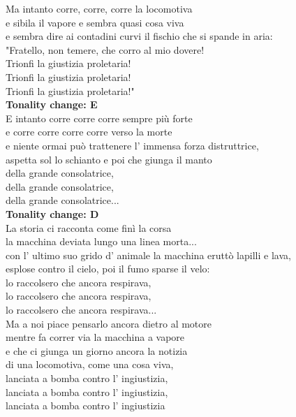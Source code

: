 \documentclass[10pt, twoside, a4paper]{article}
\begin{document}
Ma intanto corre, corre, corre la locomotiva    \\
e sibila il vapore e sembra quasi cosa viva     \\
e sembra dire ai contadini curvi il fischio che si spande in aria:\\
"Fratello, non temere, che corro al mio dovere!\\
Trionfi la giustizia proletaria!\\
Trionfi la giustizia proletaria!\\
Trionfi la giustizia proletaria!"\\

\textbf{Tonality change: E}\\
E intanto corre corre corre sempre più forte\\
e corre corre corre corre verso la morte\\
e niente ormai può trattenere l' immensa forza distruttrice,\\
aspetta sol lo schianto e poi che giunga il manto\\
della grande consolatrice,\\
della grande consolatrice,\\
della grande consolatrice...\\

\textbf{Tonality change: D}\\
La storia ci racconta come finì la corsa\\
la macchina deviata lungo una linea morta...\\
con l' ultimo suo grido d' animale la macchina eruttò lapilli e lava,\\
esplose contro il cielo, poi il fumo sparse il velo:\\
lo raccolsero che ancora respirava,\\
lo raccolsero che ancora respirava,\\
lo raccolsero che ancora respirava...\\

Ma a noi piace pensarlo ancora dietro al motore\\
mentre fa correr via la macchina a vapore\\
e che ci giunga un giorno ancora la notizia\\
di una locomotiva, come una cosa viva,\\
lanciata a bomba contro l' ingiustizia,\\
lanciata a bomba contro l' ingiustizia,\\
lanciata a bomba contro l' ingiustizia\\
\end{document}
